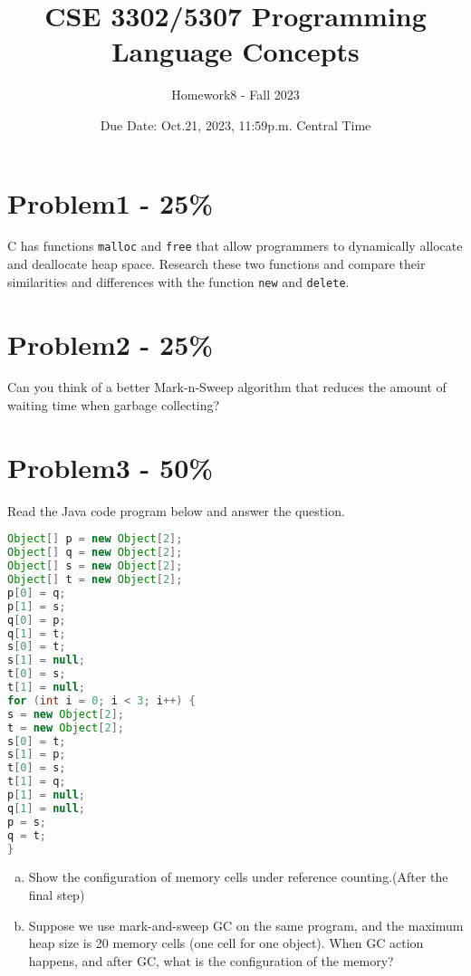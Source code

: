 \documentclass{article}
\begin{document}
\title{CSE 3302/5307 Programming Language Concepts}
\author{Homework8 - Fall 2023}
\date{Due Date: Oct.21, 2023, 11:59p.m. Central Time}
\maketitle
\thispagestyle{fancy}


\section*{Problem1 - 25\%}

C has functions \texttt{malloc} and \texttt{free} that allow programmers to dynamically allocate and deallocate heap space. Research these two functions and compare their similarities and differences with the function \texttt{new} and \texttt{delete}.


\section*{Problem2 - 25\%}

Can you think of a better Mark-n-Sweep algorithm that reduces the amount of waiting time when garbage collecting?

\section*{Problem3 - 50\%}

Read the Java code program below and answer the question.
	
\centering
\begin{lstlisting}[language=Java] 
Object[] p = new Object[2];
Object[] q = new Object[2];
Object[] s = new Object[2];
Object[] t = new Object[2];
p[0] = q;
p[1] = s;
q[0] = p;
q[1] = t;
s[0] = t;
s[1] = null;
t[0] = s;
t[1] = null;
for (int i = 0; i < 3; i++) {
s = new Object[2];
t = new Object[2];
s[0] = t;
s[1] = p;
t[0] = s;
t[1] = q;
p[1] = null;
q[1] = null;
p = s;
q = t;
}
\end{lstlisting} 

\begin{enumerate}[(a)]
    \item Show the configuration of memory cells under reference counting.(After the final step)
    \item Suppose we use mark-and-sweep GC on the same program, and the maximum heap
    size is 20 memory cells (one cell for one object). When GC action happens, and after GC, what is the
    configuration of the memory?
\end{enumerate}
\end{document}
